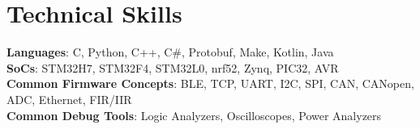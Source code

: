 \documentclass[letterpaper,11pt]{article}
\begin{document}
\section{Technical Skills}
 \begin{itemize}[leftmargin=0.15in, label={}]
    \small{\item{
     \textbf{Languages}{: C, Python, C++, C\#, Protobuf, Make, Kotlin, Java} \\
     \textbf{SoCs}{: STM32H7, STM32F4, STM32L0, nrf52, Zynq, PIC32, AVR} \\
     \textbf{Common Firmware Concepts}{: BLE, TCP, UART, I2C, SPI, CAN, CANopen, ADC, Ethernet, FIR/IIR } \\
     \textbf{Common Debug Tools}{: Logic Analyzers, Oscilloscopes, Power Analyzers }
    }}
 \end{itemize}

\end{document}
